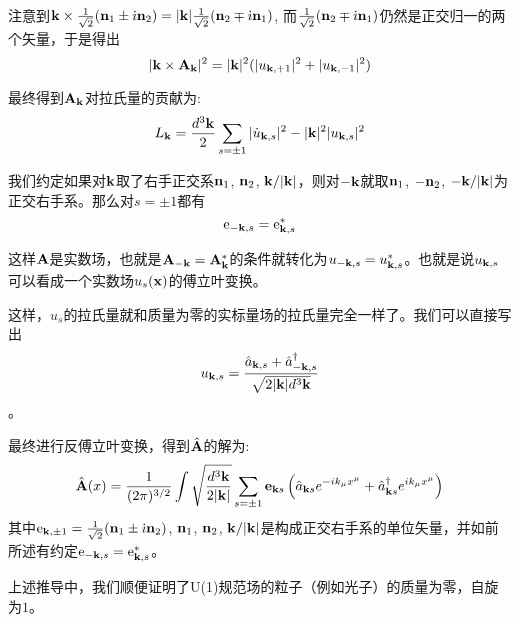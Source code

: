 \documentclass[CJK]{beamer}
\begin{document}
\begin{frame}
\bch
注意到${\mathbf{k}} \times \frac{1}{\sqrt{2}}({\mathbf{n}}_1\pm {\dot{\imath}}{\mathbf{n}}_2) =|{\mathbf{k}}|  \frac{1}{\sqrt{2}}({\mathbf{n}}_2 \mp {\dot{\imath}} {\mathbf{n}}_1)$, 而$ \frac{1}{\sqrt{2}}({\mathbf{n}}_2 \mp {\dot{\imath}} {\mathbf{n}}_1)$仍然是正交归一的两个矢量，于是得出
$$ |{\mathbf{k}} \times {\mathbf{A}}_{\mathbf{k}}|^2 = |{\mathbf{k}}|^2(|u_{{\mathbf{k}},+1}|^2 + |u_{{\mathbf{k}},-1}|^2)$$

最终得到${\mathbf{A}}_{\mathbf{k}}$对拉氏量的贡献为:
$$ L_{\mathbf{k}} = \frac{d^3{\mathbf{k}}}{2}\sum_{s=\pm 1}  |\dot u_{{\mathbf{k}},s}|^2  - |{\mathbf{k}}|^2 |u_{{\mathbf{k}},s}|^2$$

\ech
\end{frame}


\begin{frame}
\bch

我们约定如果对${\mathbf{k}}$取了右手正交系${\mathbf{n}}_1$, ${\mathbf{n}}_2$, ${\mathbf{k}}/|{\mathbf{k}}|$，则对$-{\mathbf{k}}$就取${\mathbf{n}}_1$, $-{\mathbf{n}}_2$, $-{\mathbf{k}}/|{\mathbf{k}}|$为正交右手系。那么对$s=\pm 1$都有
$$\mathrm{e}_{-{\mathbf{k}}, s}  = \mathrm{e}_{{\mathbf{k}}, s}^*$$

这样${\mathbf{A}}$是实数场，也就是${\mathbf{A}}_{-{\mathbf{k}}} = {\mathbf{A}}_{\mathbf{k}}^*$的条件就转化为$u_{-{\mathbf{k}}, s} = u_{{\mathbf{k}}, s}^*$。也就是说$u_{{\mathbf{k}}, s}$ 可以看成一个实数场$u_s({\mathbf{x}})$的傅立叶变换。
\ech
\end{frame}

\begin{frame}
\bch

这样，$u_s$的拉氏量就和质量为零的实标量场的拉氏量完全一样了。我们可以直接写出
$$ u_{{\mathbf{k}},s} = \frac{{\hat{a}}_{{\mathbf{k}},s} + {\hat{a}^\dagger}_{-{\mathbf{k}},s}}{\sqrt{2 |{\mathbf{k}}| d^3{\mathbf{k}}}}$$。

最终进行反傅立叶变换，得到$\hat{{\mathbf{A}}}$的解为:
$$\hat{{\mathbf{A}}}(x) = \frac{1}{(2\pi)^{3/2}} \int \sqrt{\frac{d^3{\mathbf{k}}}{2|{\mathbf{k}}|}} \sum_{s=\pm 1}\mathbf{e}_{{\mathbf{k}} s}\left({\hat{a}}_{{\mathbf{k}} s} e^{-ik_\mu x^\mu} + {\hat{a}^\dagger}_{{\mathbf{k}} s}e^{ik_\mu x^\mu}\right) $$
其中$\mathrm{e}_{{\mathbf{k}},\pm 1} = \frac{1}{\sqrt{2}}({\mathbf{n}}_1 \pm {\dot{\imath}} {\mathbf{n}}_2)$, ${\mathbf{n}}_1$, ${\mathbf{n}}_2$, ${\mathbf{k}}/|{\mathbf{k}}|$是构成正交右手系的单位矢量，并如前所述有约定$\mathrm{e}_{-{\mathbf{k}}, s} = \mathrm{e}_{{\mathbf{k}},s}^*$。 

\ech
\end{frame}

\begin{frame}
\bch
上述推导中，我们顺便证明了U(1)规范场的粒子（例如光子）的质量为零，自旋为$1$。
\ech
\end{frame}
\end{document}
